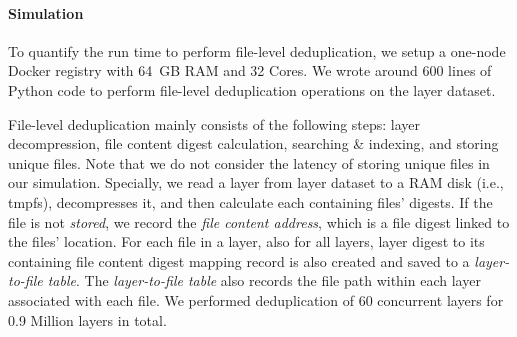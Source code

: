 \paragraph{Simulation} 
%
%
%

To quantify the run time to perform file-level deduplication, we setup a
one-node Docker registry with 64~GB RAM and 32 Cores.  
%
We wrote around 600 lines of Python code to perform file-level deduplication
operations on the layer dataset.
%

File-level deduplication mainly
consists of the following steps: 
layer decompression, 
file content digest calculation,
searching \& indexing,
and storing unique files.
%
Note that we do not consider the latency of storing unique files in our simulation. 
%
Specially, we read a layer from layer dataset
to a RAM disk (i.e., tmpfs), decompresses it, and 
then calculate each containing files' digests.
%
If the file is not \textit{stored},
we record the \textit{file content address}, which is a
file digest linked to the files' location.
%
For each file in a layer, 
also for all layers, layer digest
to its containing file content digest mapping record is also created and saved
to a \textit{layer-to-file table}.
%
The \textit{layer-to-file table} also
records the file path within each layer associated with each file.
%
%
We performed
deduplication of 60 concurrent layers for 0.9 Million layers in total.
%
%
%
%

